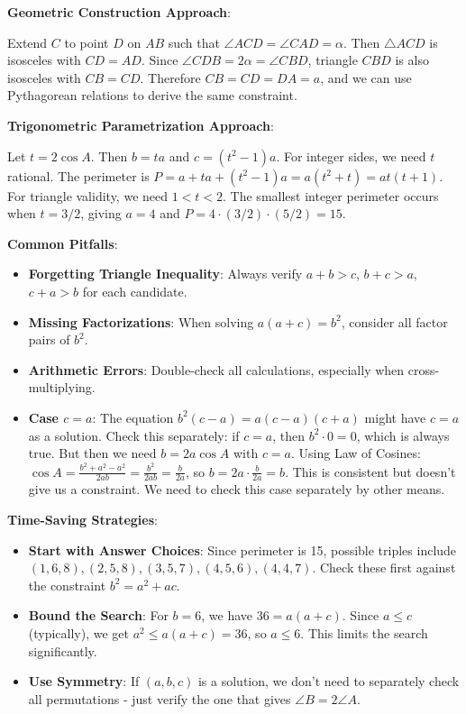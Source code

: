 \documentclass[12pt]{article}
\begin{document}
\begin{solutionbox}
\textbf{Geometric Construction Approach}:

Extend $C$ to point $D$ on $AB$ such that $\angle ACD = \angle CAD = \alpha$. Then $\triangle ACD$ is isosceles with $CD = AD$. Since $\angle CDB = 2\alpha = \angle CBD$, triangle $CBD$ is also isosceles with $CB = CD$. Therefore $CB = CD = DA = a$, and we can use Pythagorean relations to derive the same constraint.

\textbf{Trigonometric Parametrization Approach}:

Let $t = 2\cos A$. Then $b = ta$ and $c = (t^2-1)a$. For integer sides, we need $t$ rational. The perimeter is $P = a + ta + (t^2-1)a = a(t^2+t) = at(t+1)$. For triangle validity, we need $1 < t < 2$. The smallest integer perimeter occurs when $t = 3/2$, giving $a = 4$ and $P = 4 \cdot (3/2) \cdot (5/2) = 15$.

\end{solutionbox}

\begin{warning}
\textbf{Common Pitfalls}:
\begin{itemize}
    \item \textbf{Forgetting Triangle Inequality}: Always verify $a+b > c$, $b+c > a$, $c+a > b$ for each candidate.
    \item \textbf{Missing Factorizations}: When solving $a(a+c) = b^2$, consider all factor pairs of $b^2$.
    \item \textbf{Arithmetic Errors}: Double-check all calculations, especially when cross-multiplying.
    \item \textbf{Case $c = a$}: The equation $b^2(c-a) = a(c-a)(c+a)$ might have $c = a$ as a solution. Check this separately: if $c = a$, then $b^2 \cdot 0 = 0$, which is always true. But then we need $b = 2a\cos A$ with $c = a$. Using Law of Cosines: $\cos A = \frac{b^2+a^2-a^2}{2ab} = \frac{b^2}{2ab} = \frac{b}{2a}$, so $b = 2a \cdot \frac{b}{2a} = b$. This is consistent but doesn't give us a constraint. We need to check this case separately by other means.
\end{itemize}
\end{warning}

\begin{protip}
\textbf{Time-Saving Strategies}:
\begin{itemize}
    \item \textbf{Start with Answer Choices}: Since perimeter is 15, possible triples include $(1,6,8), (2,5,8), (3,5,7), (4,5,6), (4,4,7)$. Check these first against the constraint $b^2 = a^2 + ac$.
    \item \textbf{Bound the Search}: For $b = 6$, we have $36 = a(a+c)$. Since $a \leq c$ (typically), we get $a^2 \leq a(a+c) = 36$, so $a \leq 6$. This limits the search significantly.
    \item \textbf{Use Symmetry}: If $(a,b,c)$ is a solution, we don't need to separately check all permutations - just verify the one that gives $\angle B = 2\angle A$.
\end{itemize}
\end{protip}
\end{document}
